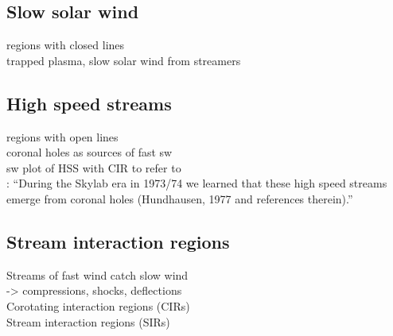 \subsection{Slow solar wind}

regions with closed lines\\
trapped plasma, slow solar wind from streamers\\


\subsection{High speed streams}

regions with open lines\\
coronal holes as sources of fast sw\\

sw plot of HSS with CIR to refer to\\

\citet{Schwenn1983}: ``During the Skylab era in 1973/74 we learned that these high speed streams emerge from coronal holes (Hundhausen, 1977 and references therein).''\\


\subsection{Stream interaction regions}

Streams of fast wind catch slow wind\\
-> compressions, shocks, deflections\\

Corotating interaction regions (CIRs)\\
Stream interaction regions (SIRs)\\

